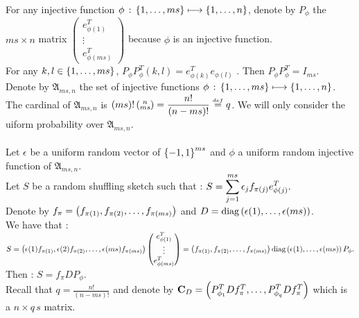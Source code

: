  For any injective function $\phi \, : \,\left\{1,\dots,m s\right\}  \longmapsto  \left\{1,\dots,n\right\} $, denote by $P_{\phi}$ the $m s\times n$ matrix $ \begin{pmatrix} e_{\phi(1)}^{T} \\ \vdots \\ e_{\phi(m s)}^{T} \end{pmatrix} $  because $\phi$ is an injective function.\\
 
 For any $k,l\in\left\{1,\dots,ms\right\}$, $P_{\phi}P_{\phi}^{T}(k,l) = e_{\phi(k)}^{T}e_{\phi(l)}$ . Then $P_{\phi}P_{\phi}^{T} = I_{ms}.$\\
 
 Denote by $\mathfrak{A}_{ms,n}$ the set of injective functions $\phi \, : \,\left\{1,\dots,m s\right\}  \longmapsto  \left\{1,\dots,n\right\} $.  The cardinal of $\mathfrak{A}_{ms,n}$ is $\displaystyle (ms)!\left(\substack{ n\\ ms}\right) = \frac{n!}{(n-ms)!} \stackrel{{\scriptscriptstyle{def}}}{=} q$. We will only consider the uiform probability over $\mathfrak{A}_{ms,n}$.\\\\
 
  Let $\epsilon$ be a uniform random vector of $\left\{-1,1\right\}^{ms}$ and $\phi$ a uniform random injective function of $\mathfrak{A}_{ms,n}$.\\
Let $S$ be a random shuffling sketch such that : $S = \displaystyle\sum_{j=1}^{ms} \epsilon_{j}f_{\pi(j)}e_{\phi(j)}^{T} .$\\

Denote by $f_{\pi} = \left( f_{\pi(1)}, f_{\pi(2)},\dots, f_{\pi(ms)} \right)$ and $D = \text{diag}\left(\epsilon(1),\dots,\epsilon(ms)\right)$.\\
We have that :\\
$S = \left( \epsilon(1)f_{\pi(1)},\epsilon(2)f_{\pi(2)},\dots,\epsilon(ms)f_{\pi(ms)} \right) \begin{pmatrix} e_{\phi(1)}^{T} \\ \vdots \\ e_{\phi(ms)}^{T} \end{pmatrix} = \left( f_{\pi(1)}, f_{\pi(2)},\dots, f_{\pi(ms)} \right) \text{diag}\left(\epsilon(1),\dots,\epsilon(ms)\right) P_{\phi}.$\\
Then : $S = f_{\pi} D P_{\phi}$.\\

Recall that $q = \frac{n!}{(n-ms)!}$ and denote by $\bold{C}_{D} = \left(P_{\phi_{1}}^{T} D f_{\pi}^{T},\dots,P_{\phi_{q}}^{T} D f_{\pi}^{T} \right) $ which is a $ n \times q \,s$ matrix.\\

